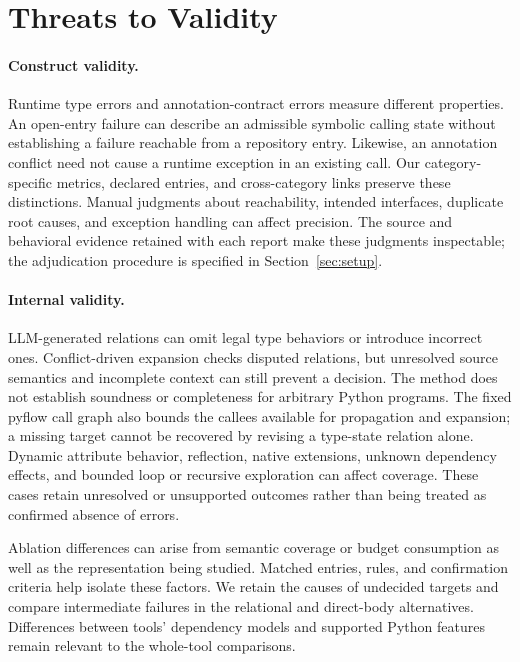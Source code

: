 \section{Threats to Validity}
\label{sec:threats}
\paragraph{Construct validity.}
Runtime type errors and annotation-contract errors measure different
properties. An open-entry failure can describe an admissible symbolic
calling state without establishing a failure reachable from a repository
entry. Likewise, an annotation conflict need not cause a runtime exception
in an existing call. Our category-specific metrics, declared entries, and
cross-category links preserve these distinctions. Manual judgments about
reachability, intended interfaces, duplicate root causes, and exception
handling can affect precision. The source and behavioral evidence retained
with each report make these judgments inspectable; the adjudication
procedure is specified in Section~\ref{sec:setup}.

\paragraph{Internal validity.}
LLM-generated relations can omit legal type behaviors or introduce incorrect
ones. Conflict-driven expansion checks disputed relations, but unresolved
source semantics and incomplete context can still prevent a decision.
The method does not establish soundness or completeness for arbitrary
Python programs. The fixed pyflow call graph also bounds the callees
available for propagation and expansion; a missing target cannot be
recovered by revising a type-state relation alone. Dynamic attribute
behavior, reflection, native extensions, unknown dependency effects, and
bounded loop or recursive exploration can affect coverage. These cases
retain unresolved or unsupported outcomes rather than being treated as
confirmed absence of errors.

Ablation differences can arise from semantic coverage or budget consumption
as well as the representation being studied. Matched entries, rules, and
confirmation criteria help isolate these factors. We retain the causes of
undecided targets and compare intermediate failures in the relational and
direct-body alternatives. Differences between tools' dependency models and
supported Python features remain relevant to the whole-tool comparisons.

